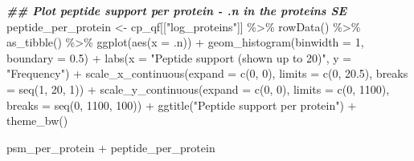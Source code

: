 \documentclass[9pt,a4paper,]{extarticle}
\newenvironment{Shaded}{\begin{snugshade}}{\end{snugshade}}
\newcommand{\AttributeTok}[1]{\textcolor[rgb]{0.77,0.63,0.00}{#1}}
\newcommand{\DecValTok}[1]{\textcolor[rgb]{0.00,0.00,0.81}{#1}}
\newcommand{\DocumentationTok}[1]{\textcolor[rgb]{0.56,0.35,0.01}{\textbf{\textit{#1}}}}
\newcommand{\FloatTok}[1]{\textcolor[rgb]{0.00,0.00,0.81}{#1}}
\newcommand{\FunctionTok}[1]{\textcolor[rgb]{0.00,0.00,0.00}{#1}}
\newcommand{\NormalTok}[1]{#1}
\newcommand{\OtherTok}[1]{\textcolor[rgb]{0.56,0.35,0.01}{#1}}
\newcommand{\SpecialCharTok}[1]{\textcolor[rgb]{0.00,0.00,0.00}{#1}}
\newcommand{\StringTok}[1]{\textcolor[rgb]{0.31,0.60,0.02}{#1}}
\begin{document}
\begin{Shaded}
\begin{Highlighting}[]
\DocumentationTok{\#\# Plot peptide support per protein {-} .n in the proteins SE}
\NormalTok{peptide\_per\_protein }\OtherTok{\textless{}{-}}\NormalTok{ cp\_qf[[}\StringTok{"log\_proteins"}\NormalTok{]] }\SpecialCharTok{\%\textgreater{}\%}
  \FunctionTok{rowData}\NormalTok{() }\SpecialCharTok{\%\textgreater{}\%}
  \FunctionTok{as\_tibble}\NormalTok{() }\SpecialCharTok{\%\textgreater{}\%}
  \FunctionTok{ggplot}\NormalTok{(}\FunctionTok{aes}\NormalTok{(}\AttributeTok{x =}\NormalTok{ .n)) }\SpecialCharTok{+}
  \FunctionTok{geom\_histogram}\NormalTok{(}\AttributeTok{binwidth =} \DecValTok{1}\NormalTok{, }\AttributeTok{boundary =} \FloatTok{0.5}\NormalTok{) }\SpecialCharTok{+}
  \FunctionTok{labs}\NormalTok{(}\AttributeTok{x =} \StringTok{"Peptide support (shown up to 20)"}\NormalTok{,}
       \AttributeTok{y =} \StringTok{"Frequency"}\NormalTok{) }\SpecialCharTok{+}
  \FunctionTok{scale\_x\_continuous}\NormalTok{(}\AttributeTok{expand =} \FunctionTok{c}\NormalTok{(}\DecValTok{0}\NormalTok{, }\DecValTok{0}\NormalTok{),}
                     \AttributeTok{limits =} \FunctionTok{c}\NormalTok{(}\DecValTok{0}\NormalTok{, }\FloatTok{20.5}\NormalTok{),}
                     \AttributeTok{breaks =} \FunctionTok{seq}\NormalTok{(}\DecValTok{1}\NormalTok{, }\DecValTok{20}\NormalTok{, }\DecValTok{1}\NormalTok{)) }\SpecialCharTok{+}
  \FunctionTok{scale\_y\_continuous}\NormalTok{(}\AttributeTok{expand =} \FunctionTok{c}\NormalTok{(}\DecValTok{0}\NormalTok{, }\DecValTok{0}\NormalTok{),}
                     \AttributeTok{limits =} \FunctionTok{c}\NormalTok{(}\DecValTok{0}\NormalTok{, }\DecValTok{1100}\NormalTok{),}
                     \AttributeTok{breaks =} \FunctionTok{seq}\NormalTok{(}\DecValTok{0}\NormalTok{, }\DecValTok{1100}\NormalTok{, }\DecValTok{100}\NormalTok{)) }\SpecialCharTok{+}
  \FunctionTok{ggtitle}\NormalTok{(}\StringTok{"Peptide support per protein"}\NormalTok{) }\SpecialCharTok{+}
  \FunctionTok{theme\_bw}\NormalTok{()}

\NormalTok{psm\_per\_protein }\SpecialCharTok{+}\NormalTok{ peptide\_per\_protein}
\end{Highlighting}
\end{Shaded}
\end{document}
